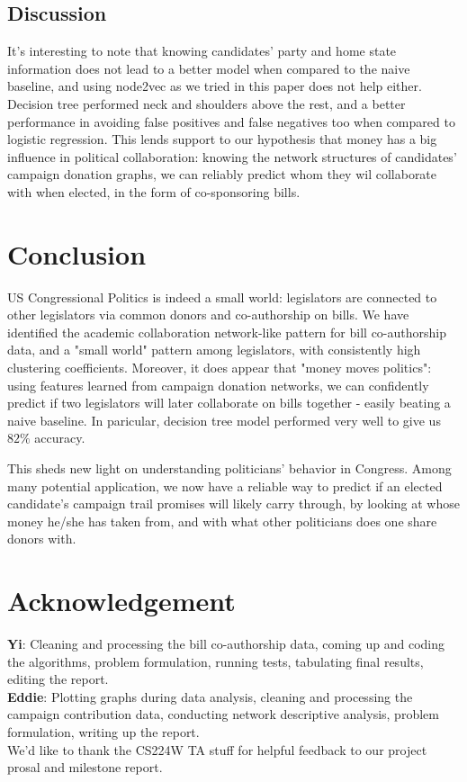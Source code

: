 \documentclass[12pt,twocolumn]{article}
\begin{document}
\subsection{Discussion}
It's interesting to note that knowing candidates' party and home state information does not lead to a better model when compared to the naive baseline, and using node2vec as we tried in this paper does not help either. Decision tree performed neck and shoulders above the rest, and a better performance in avoiding false positives and false negatives too when compared to logistic regression. This lends support to our hypothesis that money has a big influence in political collaboration: knowing the network structures of candidates' campaign donation graphs, we can reliably predict whom they wil collaborate with when elected, in the form of co-sponsoring bills. 
\section{Conclusion}
US Congressional Politics is indeed a small world: legislators are connected to other legislators via common donors and co-authorship on bills. We have identified the academic collaboration network-like pattern for bill co-authorship data, and a "small world" pattern among legislators, with consistently high clustering coefficients. Moreover, it does appear that "money moves politics": using features learned from campaign donation networks, we can confidently predict if two legislators will later collaborate on bills together - easily beating a naive baseline. In paricular, decision tree model performed very well to give us $82\%$ accuracy. 

This sheds new light on understanding politicians' behavior in Congress. Among many potential application, we now have a reliable way to predict if an elected candidate's campaign trail promises will likely carry through, by looking at whose money he/she has taken from, and with what other politicians does one share donors with. 

\section{Acknowledgement}
\textbf{Yi}: Cleaning and processing the bill co-authorship data, coming up and coding the algorithms, problem formulation, running tests, tabulating final results, editing the report. \\
\textbf{Eddie}: Plotting graphs during data analysis, cleaning and processing the campaign contribution data, conducting network descriptive analysis, problem formulation, writing up the report. \\
We'd like to thank the CS224W TA stuff for helpful feedback to our project prosal and milestone report. 
\end{document}
